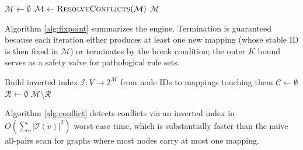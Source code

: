 \documentclass[
]{article}
\begin{document}
\begin{algorithm}
\caption{Fixpoint translation engine}
\label{alg:fixpoint}
$\mathcal{M} \leftarrow \emptyset$\;
$\mathcal{M} \leftarrow \textsc{ResolveConflicts}(\mathcal{M})$\;
\Return $\mathcal{M}$\;
\end{algorithm}

Algorithm \ref{alg:fixpoint} summarizes the engine. Termination is
guaranteed because each iteration either produces at least one new
mapping (whose stable ID is then fixed in \(\mathcal{M}\)) or terminates
by the break condition; the outer \(K\) bound serves as a safety valve
for pathological rule sets.

\begin{algorithm}
\caption{Priority-ordered conflict resolution}
\label{alg:conflict}
Build inverted index $\mathcal{I}: V \to 2^{\mathcal{M}}$ from node IDs to mappings touching them\;
$\mathcal{C} \leftarrow \emptyset$ 
$\mathcal{R} \leftarrow \emptyset$ 
\Return $\mathcal{M} \setminus \mathcal{R}$\;
\end{algorithm}

Algorithm \ref{alg:conflict} detects conflicts via an inverted index in
\(O(\sum_v |\mathcal{I}(v)|^2)\) worst-case time, which is substantially
faster than the naive all-pairs scan for graphs where most nodes carry
at most one mapping.
\end{document}
